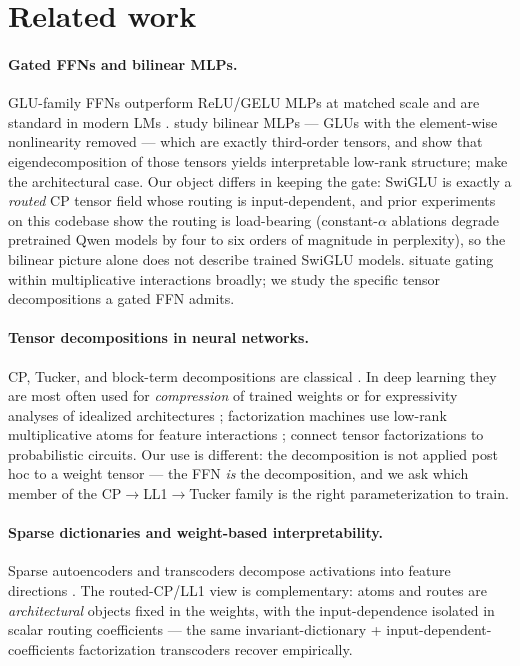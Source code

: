 \documentclass[11pt]{article}
\begin{document}
\section{Related work}
\label{sec:related}

\paragraph{Gated FFNs and bilinear MLPs.}
GLU-family FFNs outperform ReLU/GELU MLPs at matched scale and are standard in modern
LMs \citep{shazeer2020glu}. \citet{pearce2025bilinear} study bilinear MLPs --- GLUs
with the element-wise nonlinearity removed --- which are exactly third-order tensors,
and show that eigendecomposition of those tensors yields interpretable low-rank
structure; \citet{dooms2024case} make the architectural case. Our object differs in
keeping the gate: SwiGLU is exactly a \emph{routed} CP tensor field whose routing is
input-dependent, and prior experiments on this codebase show the routing is
load-bearing (constant-$\alpha$ ablations degrade pretrained Qwen models by four to
six orders of magnitude in perplexity), so the bilinear picture alone does not
describe trained SwiGLU models. \citet{jayakumar2020multiplicative} situate gating
within multiplicative interactions broadly; we study the specific tensor
decompositions a gated FFN admits.

\paragraph{Tensor decompositions in neural networks.}
CP, Tucker, and block-term decompositions are classical
\citep{kolda2009tensor,delathauwer2008blockterm}. In deep learning they are most
often used for \emph{compression} of trained weights \citep{novikov2015tensorizing}
or for expressivity analyses of idealized architectures \citep{cohen2016expressive};
factorization machines use low-rank multiplicative atoms for feature interactions
\citep{rendle2010factorization}; \citet{loconte2024relationship} connect tensor
factorizations to probabilistic circuits. Our use is different: the decomposition is
not applied post hoc to a weight tensor --- the FFN \emph{is} the decomposition, and
we ask which member of the CP$\to$LL1$\to$Tucker family is the right parameterization
to train.

\paragraph{Sparse dictionaries and weight-based interpretability.}
Sparse autoencoders and transcoders decompose activations into feature directions
\citep{bricken2023monosemanticity,dunefsky2024transcoders,paulo2025transcoders}.
The routed-CP/LL1 view is complementary: atoms and routes are \emph{architectural}
objects fixed in the weights, with the input-dependence isolated in scalar routing
coefficients --- the same invariant-dictionary + input-dependent-coefficients
factorization transcoders recover empirically.
\end{document}
